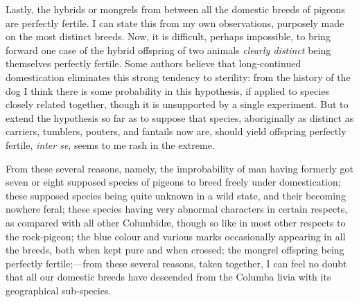 \documentclass{book}
\begin{document}
Lastly, the hybrids or mongrels from between all the domestic breeds of pigeons
are perfectly fertile. I can state this from my own observations, purposely
made on the most distinct breeds. Now, it is difficult, perhaps impossible, to
bring forward one case of the hybrid offspring of two animals \emph{clearly
distinct} being themselves perfectly fertile. Some authors believe that
long-continued domestication eliminates this strong tendency to sterility: from
the history of the dog I think there is some probability in this hypothesis, if
applied to species closely related together, though it is unsupported by a
single experiment. But to extend the hypothesis so far as to suppose that
species, aboriginally as distinct as carriers, tumblers, pouters, and fantails
now are, should yield offspring perfectly fertile, \emph{inter se}, seems to me
rash in the extreme.

From these several reasons, namely, the improbability of man having formerly
got seven or eight supposed
species of pigeons to breed freely under domestication; these supposed species
being quite unknown in a wild state, and their becoming nowhere feral; these
species having very abnormal characters in certain respects, as compared with
all other Columbidæ, though so like in most other respects to the rock-pigeon;
the blue colour and various marks occasionally appearing in all the breeds,
both when kept pure and when crossed; the mongrel offspring being perfectly
fertile;---from these several reasons, taken together, I can feel no doubt
that all our domestic breeds have descended from the Columba livia with its
geographical sub-species.
\end{document}
